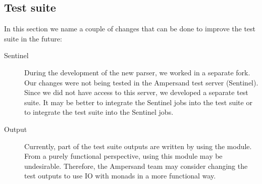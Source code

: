 
\subsection{Test suite}
\label{recommendations:tests}
  In this section we name a couple of changes that can be done to improve the test suite in the future:
  \begin{description}
    \item[Sentinel] During the development of the new parser, we worked in a separate fork.
      Our changes were not being tested in the Ampersand test server (Sentinel).
      Since we did not have access to this server, we developed a separate test suite.
      It may be better to integrate the Sentinel jobs into the test suite or to integrate the test suite into the Sentinel jobs.
    
    \item[Output] Currently, part of the test suite outputs are written by using the  module.
      From a purely functional perspective, using this module may be undesirable.
      Therefore, the Ampersand team may consider changing the test outputs to use IO with monads in a more functional way.
  \end{description}
